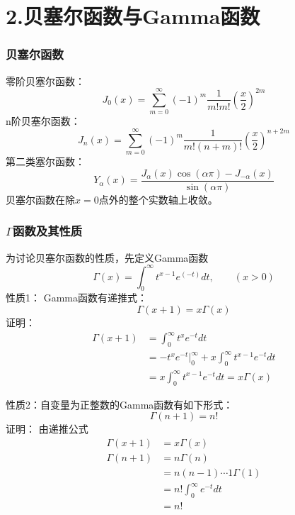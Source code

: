 \section{2.贝塞尔函数与Gamma函数}

\begin{frame}
	\frametitle{贝塞尔函数}
	零阶贝塞尔函数：
	\begin{equation*}
		J_0(x) = \sum\limits_{m=0}^{\infty} (-1)^m  \frac{1}{m! m! } (\frac{x}{2})^{2m} 
	\end{equation*}	
	n阶贝塞尔函数：
	\begin{equation*}
		J_n(x) = \sum\limits_{m=0}^{\infty} (-1)^m  \frac{1}{m! (n+m) ! } (\frac{x}{2})^{n+2m} 
	\end{equation*}	
	第二类塞尔函数：
	\begin{equation*}
		Y_{\alpha}(x)=\frac{J_{\alpha}(x) \cos (\alpha \pi)-J_{-\alpha}(x)}{\sin (\alpha \pi)}
	\end{equation*}	
	贝塞尔函数在除$x=0$点外的整个实数轴上收敛。
\end{frame}	

\begin{frame}
	\frametitle{$\Gamma$函数及其性质}
	为讨论贝塞尔函数的性质，先定义Gamma函数
	\begin{equation*}
		\Gamma(x)=\int_{0}^{\infty} t^{x-1} e^(-t) dt, \qquad (x>0)
	\end{equation*}	
	\alert{性质1：} Gamma函数有递推式：
	\begin{equation*}
		\Gamma(x+1)=x \Gamma(x)
	\end{equation*}	
	\alert{证明：}  
	\begin{equation*}
	\begin{split}
		\Gamma(x+1)&= \int_{0}^{\infty} t^{x} e^{-t} dt \\
		&= -t^x e^{-t} |_0 ^\infty + x \int_{0}^{\infty} t^{x-1} e^{-t} dt \\
		&= x \int_{0}^{\infty} t^{x-1} e^{-t} dt =x \Gamma(x)
	\end{split}
	\end{equation*}	
\end{frame}	

\begin{frame}
	\alert{性质2：}自变量为正整数的Gamma函数有如下形式：
	\begin{equation*}
		\Gamma(n+1)=n!
	\end{equation*}	
	\alert{证明：}  由递推公式
	\begin{equation*}
	\begin{split}
		\Gamma(x+1)&=x \Gamma(x) \\
		\Gamma(n+1)&=n \Gamma(n) \\
		&=n(n-1)\cdots 1 \Gamma(1) \\
		&=n! \int_{0}^{\infty}  e^{-t} dt \\
		&=n!
	\end{split}
	\end{equation*}	
\end{frame}	

